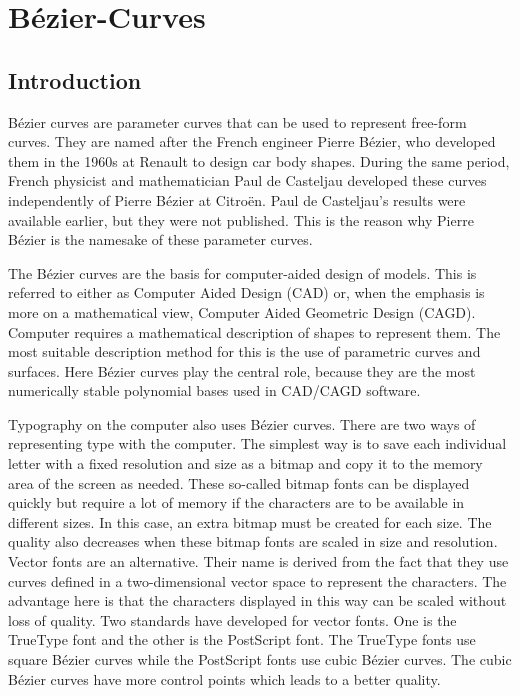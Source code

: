 %
%

\chapter{Bézier-Curves}

\section{Introduction}

Bézier curves are parameter curves that can be used to represent free-form curves. They are named after the French engineer Pierre Bézier, who developed them in the 1960s at Renault to design car body shapes. During the same period, French physicist and mathematician Paul de Casteljau developed these curves independently of Pierre Bézier at Citroën. Paul de Casteljau's results were available earlier, but they were not published. This is the reason why Pierre Bézier is the namesake of these parameter curves.\cite{Farin:2002}

\bigskip


The Bézier curves are the basis for computer-aided design of models. This is referred to either as Computer Aided Design (CAD) or, when the emphasis is more on a mathematical view, Computer Aided Geometric Design (CAGD). \cite{Babovsky:2011} Computer requires a mathematical description of shapes to represent them. The most suitable description method for this is the use of parametric curves and surfaces. Here Bézier curves play the central role, because they are the most numerically stable polynomial bases used in CAD/CAGD software.\cite{Farin:2002}

\bigskip


Typography on the computer also uses Bézier curves. There are two ways of representing type with the computer. The simplest way is to save each individual letter with a fixed resolution and size as a bitmap and copy it to the memory area of the screen as needed. These so-called bitmap fonts can be displayed quickly but require a lot of memory if the characters are to be available in different sizes. In this case, an extra bitmap must be created for each size.  The quality also decreases when these bitmap fonts are scaled in size and resolution. Vector fonts are an alternative. Their name is derived from the fact that they use curves defined in a two-dimensional vector space to represent the characters. The advantage here is that the characters displayed in this way can be scaled without loss of quality. Two standards have developed for vector fonts. One is the TrueType font and the other is the PostScript font.  The TrueType fonts use square Bézier curves while the PostScript fonts use cubic Bézier curves. The cubic Bézier curves have more control points which leads to a better quality.
 
